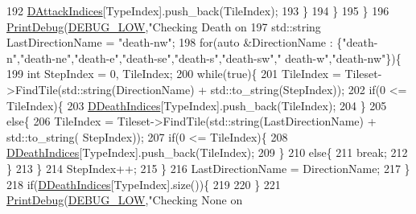 \begin{DoxyCode}
{{{{{192                         \hyperlink{classCAssetRenderer_acc2d0fab5a9f1f35a1d5eaf28ff743cc}{DAttackIndices}[TypeIndex].push\_back(TileIndex);
193                     \}   
194                 \}
195             \}
196             \hyperlink{Debug_8h_aa5f00f5537c9760f6ae1782460748ab9}{PrintDebug}(\hyperlink{Debug_8h_a3a5f3fc09784650d8388cb854882f840}{DEBUG\_LOW},\textcolor{stringliteral}{"Checking Death on %
197             std::string LastDirectionName = \textcolor{stringliteral}{"death-nw"};
198             \textcolor{keywordflow}{for}(\textcolor{keyword}{auto} &DirectionName : \{\textcolor{stringliteral}{"death-n"},\textcolor{stringliteral}{"death-ne"},\textcolor{stringliteral}{"death-e"},\textcolor{stringliteral}{"death-se"},\textcolor{stringliteral}{"death-s"},\textcolor{stringliteral}{"death-sw"},\textcolor{stringliteral}{"
      death-w"},\textcolor{stringliteral}{"death-nw"}\})\{
199                 \textcolor{keywordtype}{int} StepIndex = 0, TileIndex;
200                 \textcolor{keywordflow}{while}(\textcolor{keyword}{true})\{
201                     TileIndex = Tileset->FindTile(std::string(DirectionName) + std::to\_string(StepIndex));
202                     \textcolor{keywordflow}{if}(0 <= TileIndex)\{
203                         \hyperlink{classCAssetRenderer_a31be8b0e563072ee1168ab11154d15c8}{DDeathIndices}[TypeIndex].push\_back(TileIndex);
204                     \}
205                     \textcolor{keywordflow}{else}\{
206                         TileIndex = Tileset->FindTile(std::string(LastDirectionName) + std::to\_string(
      StepIndex));
207                         \textcolor{keywordflow}{if}(0 <= TileIndex)\{
208                             \hyperlink{classCAssetRenderer_a31be8b0e563072ee1168ab11154d15c8}{DDeathIndices}[TypeIndex].push\_back(TileIndex);
209                         \}
210                         \textcolor{keywordflow}{else}\{
211                             \textcolor{keywordflow}{break};   
212                         \}
213                     \}
214                     StepIndex++;
215                 \}
216                 LastDirectionName = DirectionName;
217             \}
218             \textcolor{keywordflow}{if}(\hyperlink{classCAssetRenderer_a31be8b0e563072ee1168ab11154d15c8}{DDeathIndices}[TypeIndex].size())\{
219                 
220             \}
221             \hyperlink{Debug_8h_aa5f00f5537c9760f6ae1782460748ab9}{PrintDebug}(\hyperlink{Debug_8h_a3a5f3fc09784650d8388cb854882f840}{DEBUG\_LOW},\textcolor{stringliteral}{"Checking None on %
}}}}}}}
\end{DoxyCode}
